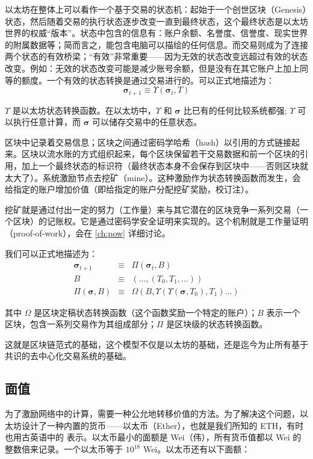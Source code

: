 \documentclass[9pt,oneside]{amsart}
\begin{document}
\begin{multicols}{2}
以太坊在整体上可以看作一个基于交易的状态机：起始于一个创世区块（Genesis）状态，然后随着交易的执行状态逐步改变一直到最终状态，这个最终状态是以太坊世界的权威“版本”。状态中包含的信息有：账户余额、名誉度、信誉度、现实世界的附属数据等；简而言之，能包含电脑可以描绘的任何信息。而交易则成为了连接两个状态的有效桥梁；“有效”非常重要——因为无效的状态改变远超过有效的状态改变。例如：无效的状态改变可能是减少账号余额，但是没有在其它账户上加上同等的额度。一个有效的状态转换是通过交易进行的。可以正式地描述为：
\begin{equation}
\boldsymbol{\sigma}_{t+1} \equiv \Upsilon(\boldsymbol{\sigma}_t, T)
\end{equation}


$\Upsilon$ 是以太坊状态转换函数。在以太坊中，$\Upsilon$ 和 $\boldsymbol{\sigma}$ 比已有的任何比较系统都强; $\Upsilon$ 可以执行任意计算，而 $\boldsymbol{\sigma}$ 可以储存交易中的任意状态。

区块中记录着交易信息；区块之间通过密码学哈希（hash）以引用的方式链接起来。区块以流水账的方式组织起来，每个区块保留若干交易数据和前一个区块的引用，加上一个最终状态的标识符（最终状态本身不会保存到区块中——否则区块就太大了）。系统激励节点去挖矿（mine）。这种激励作为状态转换函数而发生，会给指定的账户增加价值（即给指定的账户分配挖矿奖励，校订注）。

挖矿就是通过付出一定的努力（工作量）来与其它潜在的区块竞争一系列交易（一个区块）的记账权。它是通过密码学安全证明来实现的。这个机制就是工作量证明（proof-of-work），会在 \ref{ch:pow} 详细讨论。

我们可以正式地描述为：
\begin{eqnarray}
\boldsymbol{\sigma}_{t+1} & \equiv & \Pi(\boldsymbol{\sigma}_t, B) \\
B & \equiv & (..., (T_0, T_1, ...) ) \\
\Pi(\boldsymbol{\sigma}, B) & \equiv & \Omega(B, \Upsilon(\Upsilon(\boldsymbol{\sigma}, T_0), T_1) ...)
\end{eqnarray}

其中 $\Omega$ 是区块定稿状态转换函数（这个函数奖励一个特定的账户）；$B$ 表示一个区块，包含一系列交易作为其组成部分；$\Pi$ 是区块级的状态转换函数。

这就是区块链范式的基础，这个模型不仅是以太坊的基础，还是迄今为止所有基于共识的去中心化交易系统的基础。


\subsection{面值}

为了激励网络中的计算，需要一种公允地转移价值的方法。为了解决这个问题，以太坊设计了一种内置的货币——以太币（Ether），也就是我们所知的 ETH，有时也用古英语中的 \DH{} 表示。以太币最小的面额是 Wei（伟），所有货币值都以 Wei 的整数倍来记录。一个以太币等于 $10^{18}$ Wei。以太币还有以下面额：


\end{multicols}
\end{document}
